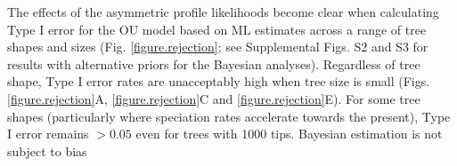 \documentclass[a4paper,12pt]{article}
\begin{document}
The effects of the asymmetric profile likelihoods become clear when calculating Type I error for the OU model based on ML estimates across a range of tree shapes and sizes (Fig. \ref{figure.rejection}; see Supplemental Figs. S2 and S3 for results with alternative priors for the Bayesian analyses). Regardless of tree shape, Type I error rates are unacceptably high when tree size is small (Figs. \ref{figure.rejection}A, \ref{figure.rejection}C and \ref{figure.rejection}E). For some tree shapes (particularly where speciation rates accelerate towards the present), Type I error remains $>0.05$ even for trees with 1000 tips. Bayesian estimation is not subject to bias %


\end{document}
